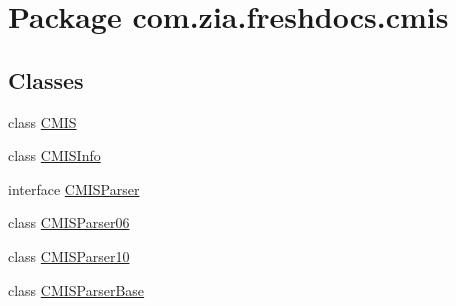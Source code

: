 \hypertarget{namespacecom_1_1zia_1_1freshdocs_1_1cmis}{\section{Package com.\-zia.\-freshdocs.\-cmis}
\label{namespacecom_1_1zia_1_1freshdocs_1_1cmis}
}
\subsection*{Classes}
\begin{DoxyCompactItemize}
\item 
class \hyperlink{classcom_1_1zia_1_1freshdocs_1_1cmis_1_1_c_m_i_s}{C\-M\-I\-S}
\item 
class \hyperlink{classcom_1_1zia_1_1freshdocs_1_1cmis_1_1_c_m_i_s_info}{C\-M\-I\-S\-Info}
\item 
interface \hyperlink{interfacecom_1_1zia_1_1freshdocs_1_1cmis_1_1_c_m_i_s_parser}{C\-M\-I\-S\-Parser}
\item 
class \hyperlink{classcom_1_1zia_1_1freshdocs_1_1cmis_1_1_c_m_i_s_parser06}{C\-M\-I\-S\-Parser06}
\item 
class \hyperlink{classcom_1_1zia_1_1freshdocs_1_1cmis_1_1_c_m_i_s_parser10}{C\-M\-I\-S\-Parser10}
\item 
class \hyperlink{classcom_1_1zia_1_1freshdocs_1_1cmis_1_1_c_m_i_s_parser_base}{C\-M\-I\-S\-Parser\-Base}
\end{DoxyCompactItemize}
